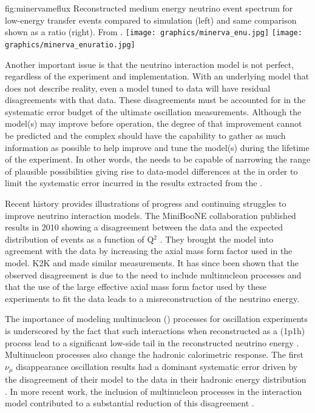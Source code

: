\begin{dunefigure}{fig:minervameflux}
{Reconstructed  medium energy  neutrino event spectrum for low-energy transfer events compared to simulation (left) and same comparison shown as a ratio (right). From \cite{JenaNUINT2018}.}
\texttt{[image: graphics/minerva\_enu.jpg]}
\texttt{[image: graphics/minerva\_enuratio.jpg]}
\end{dunefigure}

Another important issue is that the neutrino interaction model is not perfect, regardless of the experiment and implementation.  With an underlying model that does not describe reality, even a model tuned to   data will have residual disagreements with that data.  These disagreements must be accounted for in the systematic error budget of the ultimate oscillation measurements.  Although the model(s) may improve before  operation, the degree of that improvement cannot be predicted and the    complex should have the capability to gather as much information as possible to help improve and tune the model(s) during the lifetime of the experiment.  In other words, the   needs to be capable of narrowing the range of plausible possibilities giving rise to data-model differences at the   in order to limit the systematic error incurred in the results extracted from the  .   

Recent history provides illustrations of progress and continuing struggles to improve neutrino interaction models.  The MiniBooNE collaboration published results in 2010 showing a disagreement between the data and the expected distribution of  events as a function of Q$^{2}$ \cite{AguilarArevalo:2010cx,Gran:2006jn}.   They brought the model into agreement with the data by increasing the axial mass form factor used in the model.  K2K \cite{Gran:2006jn} and  \cite{Adamson:2014pgc} made similar measurements.  It has since been shown that the observed disagreement is due to the need to include multinucleon processes and that the use of the large effective axial mass form factor used by these experiments to fit the data leads to a misreconstruction of the neutrino energy.  

The importance of modeling multinucleon () processes for oscillation experiments is underscored by the fact that such interactions when reconstructed as a  (1p1h) process lead to a significant low-side tail in the reconstructed neutrino energy \cite{Martini:2012uc}.  Multinucleon processes also change the hadronic calorimetric response.  The first    $\nu_{\mu}$ disappearance oscillation results had a dominant systematic error driven by the disagreement of their model to the data in their hadronic energy distribution \cite{Adamson:2016xxw}.  In more recent work, the inclusion of multinucleon processes in the interaction model contributed to a substantial reduction of this disagreement \cite{NOvA:2018gge}.


